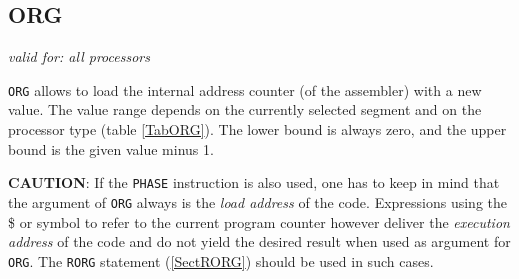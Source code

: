 \documentclass[12pt,twoside]{report}
\makeatletter
\newcommand{\tty}[1]{{\tt #1}}
\newcommand{\ttindex}[1]{\index{#1@{\tt #1}}}
\makeatother
\begin{document}

\subsection{ORG}
\label{SectORG}
\ttindex{ORG}

{\em valid for: all processors}

\tty{ORG} allows to load the internal address counter (of the assembler)
with a new value. The value range depends on the currently selected
segment and on the processor type (table \ref{TabORG}).
The lower bound is always zero, and the upper bound is the given value
minus 1.
\par
{\bf CAUTION}: If the \tty{PHASE} instruction is also used, one
has to keep in mind that the argument of \tty{ORG} always is the
{\em load address} of the code.  Expressions using the \$ or \*
symbol to refer to the current program counter however deliver
the {\em execution address} of the code and do not yield the
desired result when used as argument for \tty{ORG}.  The
\tty{RORG} statement (\ref{SectRORG}) should be used in such cases.
\end{document}
